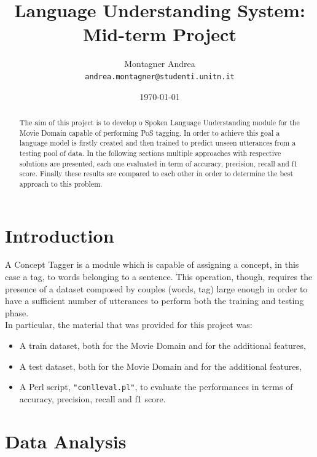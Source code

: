 \documentclass[11pt,a4paper]{article}
\title{Language Understanding System: Mid-term Project}
\author{Montagner Andrea \\
  {\tt andrea.montagner@studenti.unitn.it}}
\date{\today}
\begin{document}
\maketitle
\begin{abstract}
The aim of this project is to develop o Spoken Language Understanding module for the Movie Domain capable of performing PoS tagging. In order to achieve this goal a language model is firstly created and then trained to predict unseen utterances from a testing pool of data. In the following sections multiple approaches with respective solutions are presented, each one evaluated in term of accuracy, precision, recall and f1 score. Finally these results are compared to each other in order to determine the best approach to this problem.
\end{abstract}

\section{Introduction}

A Concept Tagger is a module which is capable of assigning a concept, in this case a tag, to words belonging to a sentence. This operation, though, requires the presence of a dataset composed by couples (words, tag) large enough in order to have a sufficient number of utterances to perform both the training and testing phase.\\
In particular, the material that was provided for this project was:
\begin{itemize}
	\item A train dataset, both for the Movie Domain and for the additional features,
	\item A test dataset, both for the Movie Domain and for the additional features,
	\item A Perl script, {\tt "conlleval.pl"}, to evaluate the performances in terms of accuracy, precision, recall and f1 score.
\end{itemize}


\section{Data Analysis}
\label{sec:datanalysis}
\end{document}
